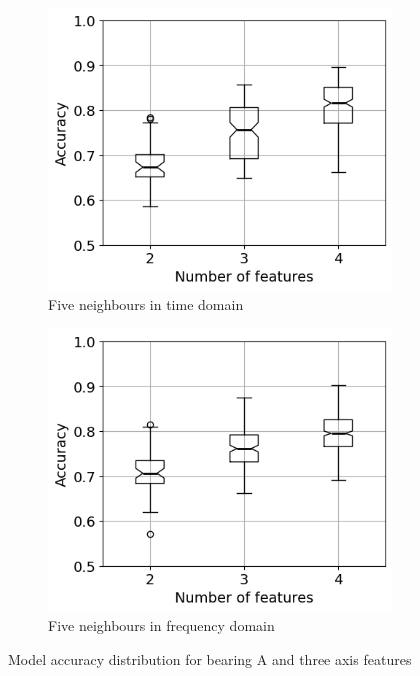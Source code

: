 \begin{figure}[h]
\begin{subfigure}[b]{0.48\textwidth}
    \end{subfigure}
    \hfill
    \begin{subfigure}[b]{0.48\textwidth}
        \includegraphics[width=\textwidth]{assets/results/feature-combinations/TD-3-A-False-False-K5.png}
        \caption{Five neighbours in time domain}
    \end{subfigure}
    \hfill
    \begin{subfigure}[b]{0.48\textwidth}
        \includegraphics[width=\textwidth]{assets/results/feature-combinations/FD-3-A-False-False-K5.png}
        \caption{Five neighbours in frequency domain}
    \end{subfigure}
    \caption{Model accuracy distribution for bearing A and three axis features}
    \label{fig:evaluation:model-accuracy}
\end{figure}

